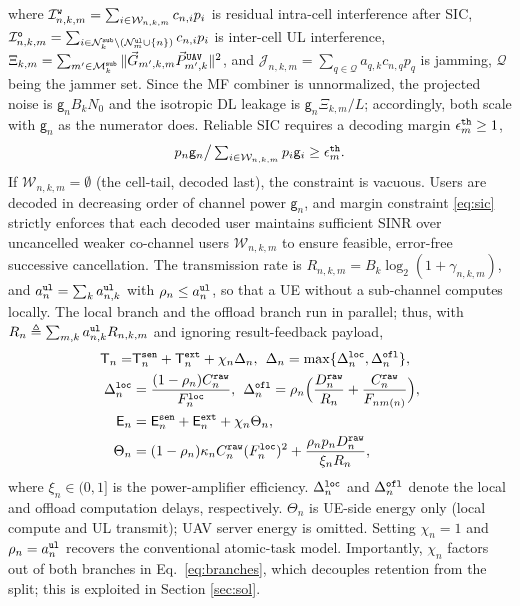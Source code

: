 \documentclass[journal]{IEEEtran}
\begin{document}
where $\mathcal{I}_{n,k,m}^{\tt w}=\sum_{i\in\mathcal{W}_{n,k,m}}c_{n,i} p_i$ is residual intra-cell interference after SIC,
$\mathcal{I}_{n,k,m}^{\tt o}=\sum_{i\in\mathcal{N}_k^{\tt sub}\setminus(\mathcal{N}_m^{\tt ul}\cup\{n\})}c_{n,i} p_i$ is inter-cell UL interference,
$\Xi_{k,m}=\sum_{m'\in\mathcal{M}_k^{\tt sub}}\Vert\vec{G}_{m',k,m}\vec{P}_{m',k}^{\tt UAV}\Vert^2$, and
$\mathcal{J}_{n,k,m}=\sum_{q\in\mathcal{Q}}a_{q,k}c_{n,q} p_q$ is jamming, $\mathcal{Q}$ being the jammer set. 
Since the MF combiner is unnormalized, the projected noise is $\mathsf{g}_nB_kN_0$ and the isotropic DL leakage is $\mathsf{g}_n\Xi_{k,m}/L$; accordingly, both scale with $\mathsf{g}_n$ as the numerator does.
Reliable SIC requires a decoding margin $\epsilon_m^{\tt th}\ge1$,
\begin{equation}
\textstyle p_n\mathsf{g}_n\big/\sum_{i\in\mathcal{W}_{n,k,m}}p_i\mathsf{g}_i\ge\epsilon_m^{\tt th}.
\label{eq:sic}
\end{equation}
{If $\mathcal{W}_{n,k,m}=\emptyset$ (the cell-tail, decoded last), the constraint is vacuous.} {\color{blue}Users are decoded in decreasing order of channel power $\mathsf{g}_n$, and margin constraint \eqref{eq:sic} strictly enforces that each decoded user maintains sufficient SINR over uncancelled weaker co-channel users $\mathcal{W}_{n,k,m}$ to ensure feasible, error-free successive cancellation.}
The transmission rate is $R_{n,k,m}=B_k\log_2(1+\gamma_{n,k,m})$, and $a_n^{\tt ul}=\sum_k a_{n,k}^{\tt ul}$ with $\rho_n\le a_n^{\tt ul}$, so that a UE without a sub-channel computes locally. The local branch and the offload branch run in parallel; thus, with $R_n\triangleq\sum_{m,k}a_{n,k}^{\tt ul}R_{n,k,m}$ and ignoring result-feedback payload,
\begin{align}
\mathsf{T}_n=&\mathsf{T}_n^{\tt sen}+\mathsf{T}_n^{\tt ext}+\chi_n\Delta_n,
\hspace{1ex}
\Delta_n=\max\{\Delta_n^{\tt loc},\Delta_n^{\tt ofl}\},
\label{eq:Tn}\\
\Delta_n^{\tt loc}&=\frac{(1-\rho_n)C_n^{\tt raw}}{F_n^{\tt loc}}, \hspace{1ex}
\Delta_n^{\tt ofl}=\rho_n\Big(\frac{D_n^{\tt raw}}{R_n}+\frac{C_n^{\tt raw}}{F_{n m(n)}}\Big),
\label{eq:branches}\\
\mathsf{E}_n&=\mathsf{E}_n^{\tt sen}+\mathsf{E}_n^{\tt ext}+\chi_n\Theta_n,
\label{eq:En}\\
\Theta_n&=(1-\rho_n)\kappa_n C_n^{\tt raw}(F_n^{\tt loc})^2+\frac{\rho_n p_n D_n^{\tt raw}}{\xi_n R_n},
\label{eq:Theta}
\end{align}
where $\xi_n\in(0,1]$ is the power-amplifier efficiency.
{$\Delta_n^{\tt loc}$ and $\Delta_n^{\tt ofl}$ denote the local and offload computation delays, respectively.}
$\Theta_n$ is UE-side energy only (local compute and UL transmit); UAV server energy is omitted.
Setting $\chi_n=1$ and $\rho_n=a_n^{\tt ul}$ recovers the conventional atomic-task model. 
Importantly, $\chi_n$ factors out of both branches in Eq.~\eqref{eq:branches}, which decouples retention from the split; this is exploited in Section \ref{sec:sol}.
\end{document}

